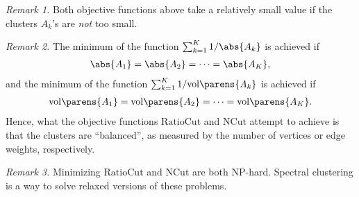 \documentclass[12pt]{article}
\begin{document}
\begin{enumerate}[label=\textbf{\arabic*.}]
\begin{enumerate}
		\textit{Remark 1.} Both objective functions above take a relatively small value if the clusters $A_k$'s are \emph{not} too small. 
		
		\textit{Remark 2.} The minimum of the function $\sum_{k=1}^K 1 / \abs{A_k}$ is achieved if 
		\begin{align*}
			\abs{A_1} = \abs{A_2} = \cdots = \abs{A_K}, 
		\end{align*}
		and the minimum of the function $\sum_{k=1}^K 1 / \mathrm{vol} \parens{A_k}$ is achieved if 
		\begin{align*}
			\mathrm{vol} \parens{A_1} = \mathrm{vol} \parens{A_2} = \cdots = \mathrm{vol} \parens{A_K}. 
		\end{align*}
		Hence, what the objective functions $\mathrm{RatioCut}$ and $\mathrm{NCut}$ attempt to achieve is that the clusters are ``balanced'', as measured by the number of vertices or edge weights, respectively. 
		
		\textit{Remark 3.} Minimizing $\mathrm{RatioCut}$ and $\mathrm{NCut}$ are both NP-hard. Spectral clustering is a way to solve relaxed versions of these problems. 
		

\end{enumerate}
\end{enumerate}
\end{document}
